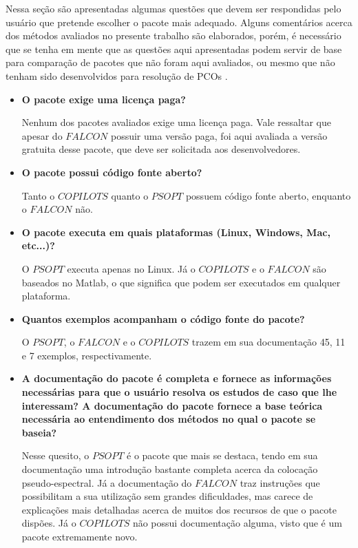 Nessa seção são apresentadas algumas questões que devem ser respondidas pelo usuário que pretende escolher o pacote mais adequado. Alguns comentários acerca dos métodos avaliados no presente trabalho são elaborados, porém, é necessário que se tenha em mente que as questões aqui apresentadas podem servir de base para comparação de pacotes que não foram aqui avaliados, ou mesmo que não tenham sido desenvolvidos para resolução de PCOs \cite{parejo_metaheuristic_2012}. 

\begin{itemize}
	\item \textbf{O pacote exige uma licença paga? }
	
	Nenhum dos pacotes avaliados exige uma licença paga. Vale ressaltar que apesar do $ FALCON $ possuir uma versão paga, foi aqui avaliada a versão gratuita desse pacote, que deve ser solicitada aos desenvolvedores.
	
	\item \textbf{O pacote possui código fonte aberto? }
	
	Tanto o $ COPILOTS $ quanto o $ PSOPT $ possuem código fonte aberto, enquanto o $ FALCON $ não.
	
	\item \textbf{O pacote executa em quais plataformas (Linux, Windows\textsuperscript{\textregistered}, Mac\textsuperscript{\textregistered}, etc...)?}
	
	O $ PSOPT $ executa apenas no Linux. Já o $ COPILOTS $ e o $ FALCON $ são baseados no Matlab\textsuperscript{\textregistered}, o que significa que podem ser executados em qualquer plataforma. 
	
	\item \textbf{Quantos exemplos acompanham o código fonte do pacote?}
	
	O $ PSOPT $, o $ FALCON $ e o $ COPILOTS $ trazem em sua documentação 45, 11 e 7 exemplos, respectivamente.
	
	\item \textbf{A documentação do pacote é completa e fornece as informações necessárias para que o usuário resolva os estudos de caso que lhe interessam? A documentação do pacote fornece a base teórica necessária ao entendimento dos métodos no qual o pacote se baseia?}
	
	Nesse quesito, o $ PSOPT $ é o pacote que mais se destaca, tendo em sua documentação uma introdução bastante completa acerca da colocação pseudo-espectral. Já a documentação do $ FALCON $ traz instruções que possibilitam a sua utilização sem grandes dificuldades, mas carece de explicações mais detalhadas acerca de muitos dos recursos de que o pacote dispões. Já o $ COPILOTS $ não possui documentação alguma, visto que é um pacote extremamente novo.  
	

\end{itemize}
